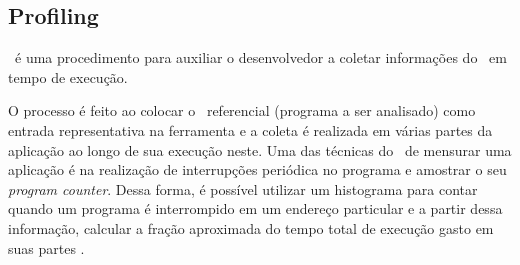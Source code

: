 
   \subsection{Profiling} \label{sec:profile}
         \Profile\ é uma procedimento para auxiliar o desenvolvedor a coletar informações do \software\ em tempo de execução.

         O processo é feito ao colocar o \software\ referencial (programa a ser analisado) como entrada representativa na ferramenta e a coleta é realizada em várias partes da aplicação ao longo de sua execução neste.
         Uma das técnicas do \profile\ de mensurar uma aplicação é na realização de interrupções periódica no programa e amostrar o seu \textit{program counter}.
         Dessa forma, é possível utilizar um histograma para contar quando um programa é interrompido em um endereço particular e a partir dessa informação, calcular a fração aproximada do tempo total de execução gasto em suas partes \cite{Graham1982}.
